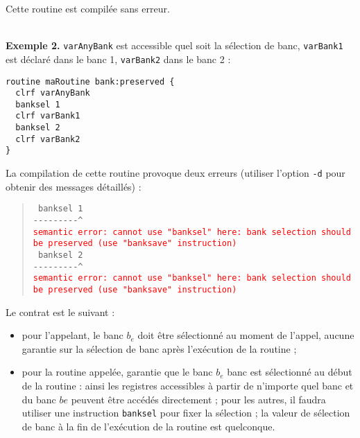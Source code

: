 Cette routine est compilée sans erreur.


~\\
\textbf{Exemple 2.} \texttt{varAnyBank} est accessible quel soit la sélection de banc, \texttt{varBank1} est déclaré dans le banc 1, \texttt{varBank2} dans le banc 2 :
\begin{lstlisting}[language=piccolo]
routine maRoutine bank:preserved {
  clrf varAnyBank
  banksel 1
  clrf varBank1
  banksel 2
  clrf varBank2
}
\end{lstlisting}

La compilation de cette routine provoque deux erreurs (utiliser l’option \texttt{-d} pour obtenir des messages détaillés) :

\begin{quote}
\texttt{ banksel 1}\\
\texttt{-{-}-{-}-{-}-{-}-\^}\\
\textcolor{red}{\tt semantic error: cannot use "banksel" here: bank selection should be preserved (use "banksave" instruction)}\\

\texttt{  banksel 2}\\
\texttt{-{-}-{-}-{-}-{-}-\^}\\
\textcolor{red}{\tt semantic error: cannot use "banksel" here: bank selection should be preserved (use "banksave" instruction)}
\end{quote}














Le contrat est le suivant :
\begin{itemize}
  \item pour l'appelant, le banc $b_e$ doit être sélectionné au moment de l'appel, aucune garantie sur la sélection de banc après l'exécution de la routine ; 
  \item pour la routine appelée, garantie que le banc $b_e$ banc est sélectionné au début de la routine : ainsi les registres accessibles à partir de n'importe quel banc et du banc $be$ peuvent être accédés directement ; pour les autres, il faudra utiliser une instruction \texttt{banksel} pour fixer la sélection ; la valeur de sélection de banc à la fin de l'exécution de la routine est quelconque.
\end{itemize}

